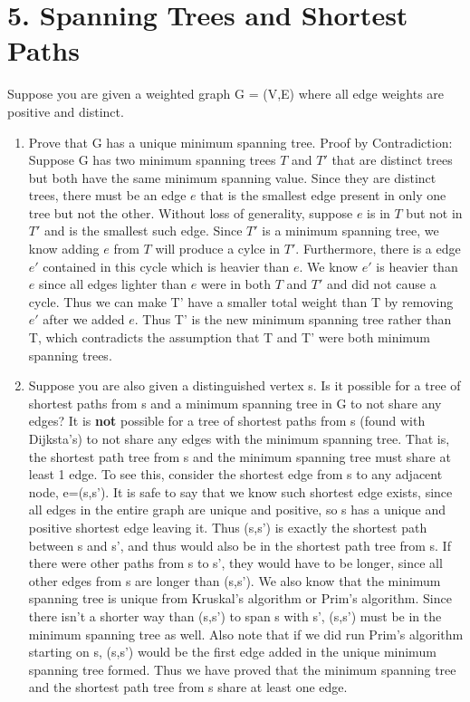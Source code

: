 \documentclass[11pt]{article}
\begin{document}
\section*{5. Spanning Trees and Shortest Paths} 
Suppose you are given a weighted graph G = (V,E) where all edge weights are positive and distinct.
\begin{enumerate}
\item Prove that G has a unique minimum spanning tree. Proof by Contradiction: \newline
Suppose G has two minimum spanning trees $T$ and $T'$ that are distinct trees but both have the same minimum spanning value. Since they are distinct trees, there must be an edge $e$ that is the smallest edge present in only one tree but not the other. Without loss of generality, suppose $e$ is in $T$ but not in $T'$ and is the smallest such edge. Since $T'$ is a minimum spanning tree, we know adding $e$ from $T$ will produce a cylce in $T'$. Furthermore, there is a edge $e'$ contained in this cycle which is heavier than $e$. We know $e'$ is heavier than $e$ since all edges lighter than $e$ were in both $T$ and $T'$ and did not cause a cycle. Thus we can make T' have a smaller total weight than T by removing $e'$ after we added $e$. Thus T' is the new minimum spanning tree rather than T, which contradicts the assumption that T and T' were both minimum spanning trees.
\item Suppose you are also given a distinguished vertex s. Is it possible for a tree of shortest paths from s and a minimum spanning tree in G to not share any edges?\newline
It is \textbf{not} possible for a tree of shortest paths from s (found with Dijksta's) to not share any edges with the minimum spanning tree. That is, the shortest path tree from s and the minimum spanning tree must share at least 1 edge. To see this, consider the shortest edge from s to  any adjacent node, e=(s,s'). It is safe to say that we know such shortest edge exists, since all edges in the entire graph are unique and positive, so s has a unique and positive shortest edge leaving it. Thus (s,s') is exactly the shortest path between s and s', and thus would also be in the shortest path tree from s. If there were other paths from s to s', they would have to be longer, since all other edges from s are longer than (s,s'). We also know that the minimum spanning tree is unique from Kruskal's algorithm or Prim's algorithm. Since there isn't a shorter way than (s,s') to span s with s', (s,s') must be in the minimum spanning tree as well. Also note that if we did run Prim's algorithm starting on s, (s,s') would be the first edge added in the unique minimum spanning tree formed. Thus we have proved that the minimum spanning tree and the shortest path tree from s share at least one edge.

\end{enumerate}
\end{document}
